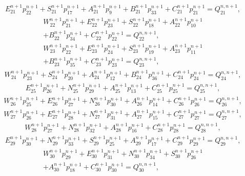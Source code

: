 \begin{multline}
\label{solution22}
E^{n+1}_{21}p^{n+1}_{22}+S^{n+1}_{21}p^{n+1}_{17}+A^{n+1}_{21}p^{n+1}_{9}+B^{n+1}_{21}p^{n+1}_{33}+C^{n+1}_{21}p^{n+1}_{21}=Q^{n, n+1}_{21},
\end{multline}
\begin{multline}
\label{solution23}
W^{n+1}_{22}p^{n+1}_{21}+E^{n+1}_{22}p^{n+1}_{23}+S^{n+1}_{22}p^{n+1}_{18}+A^{n+1}_{22}p^{n+1}_{10}\\+B^{n+1}_{22}p^{n+1}_{34}+C^{n+1}_{22}p^{n+1}_{22}=Q^{n, n+1}_{22},
\end{multline}
\begin{multline}
\label{solution24}
W^{n+1}_{23}p^{n+1}_{22}+E^{n+1}_{23}p^{n+1}_{24}+S^{n+1}_{23}p^{n+1}_{19}+A^{n+1}_{23}p^{n+1}_{11}\\+B^{n+1}_{23}p^{n+1}_{35}+C^{n+1}_{23}p^{n+1}_{23}=Q^{n, n+1}_{23},
\end{multline}
\begin{multline}
\label{solution25}
W^{n+1}_{24}p^{n+1}_{23}+S^{n+1}_{24}p^{n+1}_{20}+A^{n+1}_{24}p^{n+1}_{12}+B^{n+1}_{24}p^{n+1}_{36}+C^{n+1}_{24}p^{n+1}_{24}=Q^{n, n+1}_{24},
\end{multline}
\begin{multline}
\label{solution26}
E^{n+1}_{25}p^{n+1}_{26}+N^{n+1}_{25}p^{n+1}_{29}+A^{n+1}_{25}p^{n+1}_{13}+C^{n+1}_{25}p^{n+1}_{25}=Q^{n, n+1}_{25},
\end{multline}
\begin{multline}
\label{solution27}
W^{n+1}_{26}p^{n+1}_{25}+E^{n+1}_{26}p^{n+1}_{27}+N^{n+1}_{26}p^{n+1}_{30}+A^{n+1}_{26}p^{n+1}_{14}+C^{n+1}_{26}p^{n+1}_{26}=Q^{n, n+1}_{26},
\end{multline}
\begin{multline}
\label{solution28}
W^{n+1}_{27}p^{n+1}_{26}+E^{n+1}_{27}p^{n+1}_{28}+N^{n+1}_{27}p^{n+1}_{31}+A^{n+1}_{27}p^{n+1}_{15}+C^{n+1}_{27}p^{n+1}_{27}=Q^{n, n+1}_{27},
\end{multline}
\begin{multline}
\label{solution29}
W^{n+1}_{28}p^{n+1}_{27}+N^{n+1}_{28}p^{n+1}_{32}+A^{n+1}_{28}p^{n+1}_{16}+C^{n+1}_{28}p^{n+1}_{28}=Q^{n, n+1}_{28},
\end{multline}
\begin{multline}
\label{solution30}
E^{n+1}_{29}p^{n+1}_{30}+N^{n+1}_{29}p^{n+1}_{33}+S^{n+1}_{29}p^{n+1}_{25}+A^{n+1}_{29}p^{n+1}_{17}+C^{n+1}_{29}p^{n+1}_{29}=Q^{n, n+1}_{29},
\end{multline}
\begin{multline}
\label{solution31}
W^{n+1}_{30}p^{n+1}_{29}+E^{n+1}_{30}p^{n+1}_{31}+N^{n+1}_{30}p^{n+1}_{34}+S^{n+1}_{30}p^{n+1}_{26}\\+A^{n+1}_{30}p^{n+1}_{18}+C^{n+1}_{30}p^{n+1}_{30}=Q^{n, n+1}_{30},
\end{multline}
